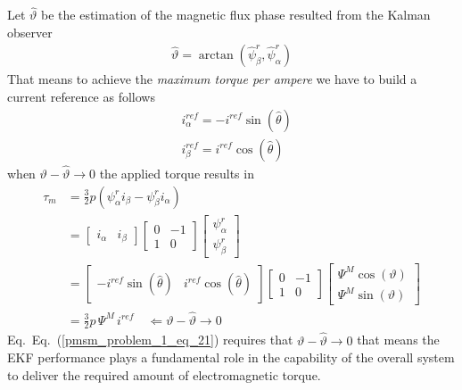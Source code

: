 \documentclass[11pt,a4paper]{scrartcl}
\numberwithin{equation}{section}
\theoremstyle{it}
\theoremstyle{definition}
\renewcommand{\eqref}[1]{Eq.~(\ref{#1})}
\begin{document}
\begin{onehalfspace}
Let $\hat{\vartheta}$ be the estimation of the magnetic flux phase resulted 
from the Kalman observer 
\begin{equation}\label{pmsm_problem_1_eq_19}
	\begin{aligned}
		\hat{\vartheta} = 
		\arctan\left(\hat{\psi}^r_{\beta},\hat{\psi}^r_{\alpha} \right)  
	\end{aligned} 
\end{equation}
That means to achieve the \textit{maximum torque per ampere} we have to build a 
current reference as follows 
\begin{equation}\label{pmsm_problem_1_eq_20}
	\begin{aligned}
		&i_{\alpha}^{ref} = -i^{ref}\sin(\hat{\theta})  \\[6pt]
		&i_{\beta}^{ref} = i^{ref}\cos(\hat{\theta})
	\end{aligned} 
\end{equation}
when $\vartheta - \hat{\vartheta} \rightarrow 0$ the applied torque results in
\begin{equation}\label{pmsm_problem_1_eq_21}
	\begin{aligned}
		\tau_m &= \frac{3}{2}p\left( 
		\psi^r_{\alpha}i_{\beta}-\psi^r_{\beta}i_{\alpha}\right) \\[6pt]
		&= \begin{bmatrix}
			i_{\alpha} & i_{\beta}
		\end{bmatrix} \begin{bmatrix}
			0 & -1 \\[6pt] 1 & 0
		\end{bmatrix}\begin{bmatrix}
			\psi^r_{\alpha} \\[6pt] \psi^r_{\beta}
		\end{bmatrix}\\[6pt]
		&= \begin{bmatrix}
			-i^{ref}\sin(\hat{\theta}) & i^{ref}\cos(\hat{\theta})
		\end{bmatrix} \begin{bmatrix}
			0 & -1 \\[6pt] 1 & 0
		\end{bmatrix}\begin{bmatrix}
			\Psi^M\cos(\vartheta) \\[6pt] \Psi^M\sin(\vartheta)
		\end{bmatrix}\\[6pt]
		&= \frac{3}{2}p\,\Psi^M\,i^{ref} \quad\Leftarrow\vartheta - \hat{\vartheta} \rightarrow 0
	\end{aligned}
\end{equation}
Eq.~\eqref{pmsm_problem_1_eq_21} requires that $\vartheta - \hat{\vartheta} \rightarrow 0$ that means the EKF performance plays a fundamental role in the capability of the overall system to deliver the required amount of electromagnetic torque. 


\end{onehalfspace}
\end{document}
